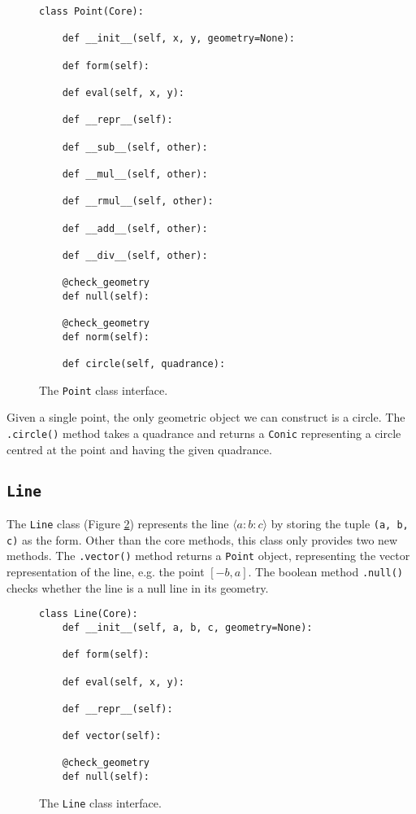 \begin{figure}[hbt!]
\begin{verbatim}
class Point(Core):

    def __init__(self, x, y, geometry=None):

    def form(self):

    def eval(self, x, y):

    def __repr__(self):

    def __sub__(self, other):

    def __mul__(self, other):

    def __rmul__(self, other):

    def __add__(self, other):

    def __div__(self, other):

    @check_geometry
    def null(self):

    @check_geometry
    def norm(self):

    def circle(self, quadrance):
\end{verbatim}
\caption{The \texttt{Point} class interface.}\label{fig:point}
\end{figure}

Given a single point, the only geometric object we can construct is a circle.
The \texttt{.circle()} method takes a quadrance and returns a \texttt{Conic} representing a circle centred at the point and having the given quadrance.

\subsection{\texttt{Line}}

The \texttt{Line} class (Figure \ref{fig:line}) represents the line $\langle a\!:\!b\!:\!c \rangle$ by storing the tuple \texttt{(a, b, c)} as the form. 
Other than the core methods, this class only provides two new methods.
The \texttt{.vector()} method returns a \texttt{Point} object, representing the vector representation of the line, e.g. the point $[-b, a]$.
The boolean method \texttt{.null()} checks whether the line is a null line in its geometry.

\begin{figure}[hbt!]
\begin{verbatim}
class Line(Core):
    def __init__(self, a, b, c, geometry=None):

    def form(self):

    def eval(self, x, y):

    def __repr__(self):

    def vector(self):

    @check_geometry
    def null(self):
\end{verbatim}
\caption{The \texttt{Line} class interface.}\label{fig:line}
\end{figure}


